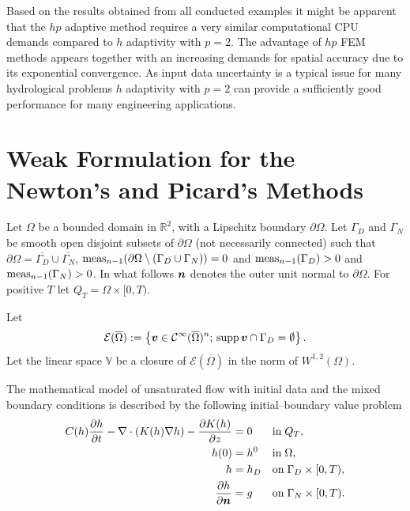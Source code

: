 \documentclass[final,3p,times,twocolumn]{elsarticle}
\newcommand{\bfv}{\mbox{\boldmath $v$}}
\newcommand{\bfn}{\mbox{\boldmath $n$}}
\newcommand{\om}{\Omega}
\begin{document}
Based on the results obtained from all conducted examples it might be apparent that the $hp$ adaptive method requires a very similar computational CPU demands compared to $h$ adaptivity with $p=2$. The advantage of $hp$ FEM methods appears together with an increasing demands for spatial accuracy due to its exponential convergence. As input data uncertainty is a typical issue for many hydrological problems $h$ adaptivity with $p=2$ can provide a sufficiently good performance for many engineering applications.



\section{Weak Formulation for the Newton's and Picard's Methods}\label{sec:9}

Let $\Omega$ be a bounded domain in $\mathbb{R}^2$,
with a Lipschitz boundary $\partial\Omega$. Let
$\Gamma_D$ and $\Gamma_N$ be smooth open disjoint subsets of
$\partial\Omega$ (not necessarily connected) such that
$\partial\Omega = \overline{\Gamma_D}\cup\overline{\Gamma_N}$,
$\textmd{meas}_{n-1}(\partial\Omega\setminus({\Gamma_D}\cup{\Gamma_N}
))=0$ and $\textmd{meas}_{n-1}(\Gamma_D)>0$ and
$\textmd{meas}_{n-1}(\Gamma_N)>0$. In what follows $\bfn$ denotes the outer unit
normal to $\partial\Omega$. For positive $T$ let
$Q_T=\Omega\times[0,T)$.

Let
\begin{displaymath}
{\mathcal{E}}(\overline{\Omega}):=\left\{\bfv\in{\mathcal
C}^\infty(\overline{\Omega})^n; \, {\textmd{supp}\, \bfv}  \cap
\Gamma_D = \emptyset \right\}.
\end{displaymath}
Let the linear space $\mathbb{V}$ be a closure of
${\mathcal{E}}(\overline{\Omega})$ in the norm of $W^{1,2}(\om)$.

The mathematical model of unsaturated flow with initial data and the
mixed boundary conditions is described by the following
initial--boundary value problem
\begin{align}
 C(h)\frac{\partial h}{\partial t}
 - \nabla \cdot \left( K(h) \nabla h \right)
  -  \frac{\partial K(h)}{\partial z}
  &= 0  &&\textmd{in}\; Q_T,
\label{dual_richards}
\\
h(0) &= h^0 &&\textmd{in}\;\Omega, \label{dual_richards_init}
\\
h &= h_D  &&\textmd{on}\;\Gamma_D \times
[0,T),\label{dirichlet_dual}
\\
\frac{\partial h}{\partial \bfn} &= g &&\textmd{on}\;\Gamma_N \times
[0,T). \label{neumann1_dual}
\end{align}
\end{document}
